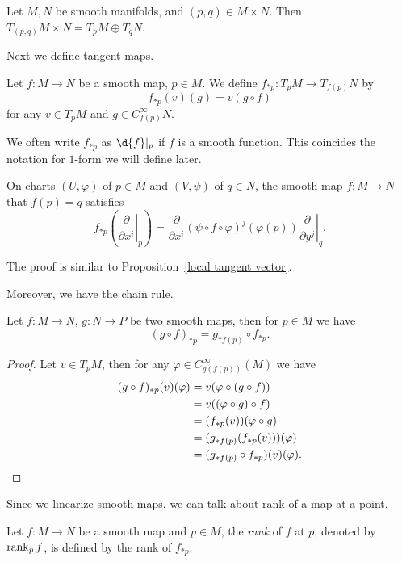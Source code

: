 \begin{eg}
    Let $M,N$ be smooth manifolds, and $(p,q)\in M\times N$.
    Then $T_{(p,q)}M\times N=T_pM\oplus T_qN$.
\end{eg}

Next we define tangent maps.
\begin{defn}
    Let $f:M\to N$ be a smooth map, $p\in M$.
    We define $f_{*p}:T_pM\to T_{f(p)}N$ by
    \[f_{*p}(v)(g)=v(g\circ f)\]
    for any $v\in T_pM$ and $g\in C^\infty_{f(p)}N$.
\end{defn}

\begin{rem}
    We often write $f_{*p}$ as $\d{f}|_p$ if $f$ is a smooth function.
    This coincides the notation for $1$-form we will define later.
\end{rem}

\begin{lem}
    On charts $(U,\varphi)$ of $p\in M$ and $(V,\psi)$ of $q\in N$, the smooth map $f:M\to N$ that $f(p)=q$ satisfies
    \[f_{*p}\left(\left.\frac{\partial{}}{\partial{x^i}}\right|_p\right)=\frac{\partial{}}{\partial{x^i}}(\psi\circ f\circ\varphi)^j(\varphi(p))\left.\frac{\partial{}}{\partial{y^j}}\right|_q.\]
\end{lem}
The proof is similar to Proposition~\ref{local tangent vector}.

Moreover, we have the chain rule.
\begin{prop}
    Let $f:M\to N$, $g:N\to P$ be two smooth maps, then for $p\in M$ we have
    \[(g\circ f)_{*p}=g_{*f(p)}\circ f_{*p}.\]
\end{prop}
\begin{proof}
    Let $v\in T_pM$, then for any $\varphi\in C^\infty_{g(f(p))}(M)$ we have
    \begin{align*}
        (g\circ f)_{*p}(v)(\varphi)&=v(\varphi\circ(g\circ f))\\
        &=v((\varphi\circ g)\circ f)\\
        &=(f_{*p}(v))(\varphi\circ g)\\
        &=(g_{*f(p)}(f_{*p}(v)))(\varphi)\\
        &=(g_{*f(p)}\circ f_{*p})(v)(\varphi).\qedhere
    \end{align*} 
\end{proof}

Since we linearize smooth maps, we can talk about rank of a map at a point.
\begin{defn}
    Let $f:M\to N$ be a smooth map and $p\in M$, the \emph{rank} of $f$ at $p$, denoted by $\operatorname{rank}_p{f}$, is defined by the rank of $f_{*p}$.
\end{defn}

